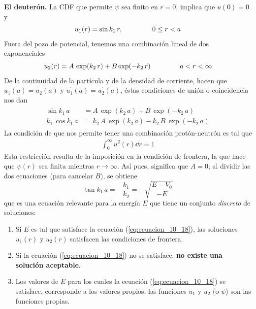 \begin{ejemplo}{\textbf{El deuterón.}}
La CDF que permite $\psi$ sea finito en $r = 0$, implica que $u(0) = 0$ y
\begin{equation}
u_{1}(r) = \sin k_{1} \, r, \hspace{1.5cm} 0 \leq r < a
\label{eq:ecuacion_10_15}
\end{equation}
Fuera del pozo de potencial, tenemos una combinación lineal de dos exponenciales
\begin{equation}
u_{2}(r) = A \, \exp(k_{2} \, r) + B \exp(-k_{2} \, r) \hspace{1.5cm} a < r < \infty
\label{eq:ecuacion_10_16}
\end{equation}
De la continuidad de la partícula y de la densidad de corriente, hacen que $u_{1}(a) = u_{2}(a)$ y $u^{\prime}_{1}(a) = u^{\prime}_{2}(a)$, éstas condiciones de unión o coincidencia nos dan
\begin{align}
\begin{aligned}
\sin k_{1} \, a &= A \, \exp(k_{2} \, a) + B \, \exp(- k_{2} \, a) \\
k_{1} \, \cos k_{1} \, a &= k_{2} \, A \, \exp(k_{2} \, a) - k_{2} \, B \, \exp(- k_{2} \, a)
\end{aligned}
\label{eq:ecuacion_10_17}
\end{align}
La condición de que nos permite tener una combinación protón-neutrón es tal que
\begin{align*}
\int_{0}^{\infty} u^{2}(r) \dd{r} = 1
\end{align*}
Esta restricción resulta de la imposición en la condición de frontera, la que hace que $\psi(r)$ sea finita mientras $r \to \infty$. Así pues, significa que $A = 0$; al dividir las dos ecuaciones (para cancelar $B$), se obtiene
\begin{equation}
\tan k_{1} \, a = - \dfrac{k_{1}}{k_{2}} = - \sqrt{\dfrac{E - V_{0}}{- E}} 
\label{eq:ecuacion_10_18}
\end{equation}
que es una ecuación relevante para la energía $E$ que tiene un conjunto \emph{discreto} de soluciones:
\begin{enumerate}
\item Si $E$ es tal que satisface la ecuación (\ref{eq:ecuacion_10_18}), las soluciones $u_{1}(r)$ y $u_{2}(r)$ satisfacen las condiciones de frontera.
\item Si la ecuación (\ref{eq:ecuacion_10_18}) no se satisface, \textbf{no existe una solución aceptable}.
\item Los valores de $E$ para los cuales la ecuación (\ref{eq:ecuacion_10_18}) se satisface, corresponde a los valores propios, las funciones $u_{1}$ y $u_{2}$ (o $\psi$) son las funciones propias.

\end{enumerate}
\end{ejemplo}
